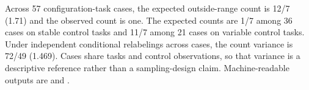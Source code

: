 \documentclass[10pt,twocolumn]{article}
\begin{document}
Across 57 configuration-task cases, the expected outside-range count is
12/7 (1.71) and the observed count is one. The expected counts are 1/7
among 36 cases on stable control tasks and 11/7 among 21 cases on
variable control tasks. Under independent conditional relabelings across
cases, the count variance is 72/49 (1.469). Cases share tasks and
control observations, so that variance is a descriptive reference rather
than a sampling-design claim. Machine-readable outputs are
 and
.
\end{document}
